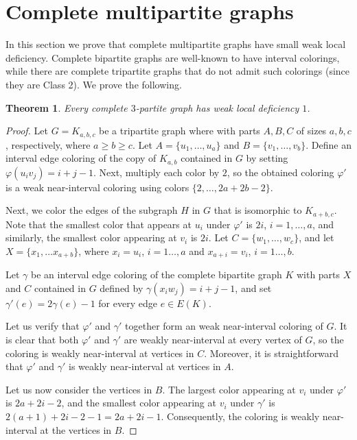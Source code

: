 \documentclass[12pt]{article}
\theoremstyle{plain}
\newtheorem{theorem}{Theorem}[section]
\theoremstyle{definition}
\numberwithin{equation}{section}
\begin{document}


\section{Complete multipartite graphs}

	In this section we prove that complete multipartite graphs have
 	small weak local deficiency. Complete bipartite graphs are well-known
	to have interval colorings, while there are complete tripartite
	graphs that do not admit such colorings (since they are Class 2).
	We prove the following.

\begin{theorem}
\label{prop:3partite}
	Every complete $3$-partite graph has weak local deficiency $1$.
\end{theorem}
\begin{proof}
	Let $G=K_{a,b,c}$ be a tripartite graph where with parts $A,B,C$ of sizes $a,b,c$, respectively, 
	where $a \geq b \geq c$. Let $A=\{u_1, \dots, u_a\}$ and $B=\{v_1,\dots, v_b\}$.
	Define an interval edge coloring of the copy of $K_{a,b}$ contained in $G$
	by setting $\varphi(u_iv_j) = i+j-1$. 
	Next, multiply each color by $2$, so
	the obtained coloring $\varphi'$ is a weak near-interval coloring using colors $\{2,\dots, 2a+2b-2\}$.

	Next, we color the edges of the subgraph $H$ in $G$ that is isomorphic to $K_{a+b,c}$. 
	Note that the smallest color that appears at $u_i$ under $\varphi'$ is $2i$, $i=1,\dots,a$,
	and similarly, the smallest color appearing at $v_i$ is $2i$.
	Let $C= \{w_1,\dots, w_c\}$, 
	and let $X=\{x_1, \dots x_{a+b}\}$,
	where $x_i = u_i$, $i=1\dots, a$ and $x_{a+i} = v_i$, $i=1\dots, b$.
	
	Let $\gamma$ be an interval edge coloring of the complete bipartite graph $K$ with 
	parts $X$ and $C$ contained in $G$
	defined by $\gamma(x_i w_j) = i+j-1$,
	and set $\gamma'(e) = 2 \gamma(e)-1$ for every edge $e \in E(K)$.

	Let us verify that $\varphi'$ and $\gamma'$ together form an weak near-interval coloring of $G$.
	It is clear that both $\varphi'$ and $\gamma'$ are weakly near-interval at every vertex of $G$, so
	the coloring is weakly near-interval at vertices in $C$.
	Moreover, it is straightforward that $\varphi'$ and $\gamma'$ is weakly near-interval at vertices in $A$.

	Let us now consider the vertices in $B$.
	The largest color appearing at $v_i$ under $\varphi'$ is $2a+2i-2$, and the smallest color
	appearing at $v_i$ under $\gamma'$ is $2(a+1) + 2i-2 -1= 2a +2i-1$. 
	Consequently, the coloring is weakly near-interval at
	the vertices in $B$.
\end{proof}
\end{document}
